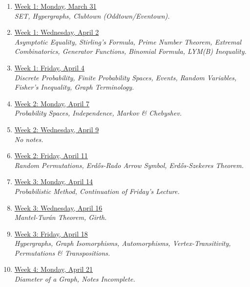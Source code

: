 \documentclass[12pt]{article}
\theoremstyle{remark}
\begin{document}
\begin{enumerate}

\item{\hyperref[1]{Week 1: Monday, March 31 }}
\\\indent\textit{SET, Hypergraphs, Clubtown (Oddtown/Eventown).}

\item  \hyperref[2]{Week 1: Wednesday, April 2 }
\\\indent\textit{Asymptotic Equality, Stirling's Formula, Prime Number Theorem, Extremal Combinatorics, Generator Functions, Binomial Formula, LYM(B) Inequality.}

\item \hyperref[3]{Week 1: Friday, April 4 }
\\\indent\textit{Discrete Probability, Finite Probability Spaces, Events, Random Variables, Fisher's Inequality, Graph Terminology.}

\item \hyperref[4]{Week 2: Monday, April 7 }
\\\indent\textit{Probability Spaces, Independence, Markov \& Chebyshev.}

\item \hyperref[5]{Week 2: Wednesday, April 9 }
\\\indent\textit{No notes.}

\item \hyperref[6]{Week 2: Friday, April 11 }
\\\indent\textit{Random Permutations, Erd\H{o}s-Rado Arrow Symbol, Erd\H{o}s-Szekeres Theorem.}

\item \hyperref[7]{Week 3: Monday, April 14 }
\\\indent\textit{Probabilistic Method, Continuation of Friday's Lecture.}

\item \hyperref[8]{Week 3: Wednesday, April 16 }
\\\indent\textit{Mantel-Tur\'an Theorem, Girth.}

\item \hyperref[9]{Week 3: Friday, April 18 }
\\\indent\textit{Hypergraphs, Graph Isomorphisms, Automorphisms, Vertex-Transitivity, Permutations \& Transpositions.}

\item \hyperref[10]{Week 4: Monday, April 21 }
\\\indent\textit{Diameter of a Graph, Notes Incomplete.}


\end{enumerate}
\end{document}
